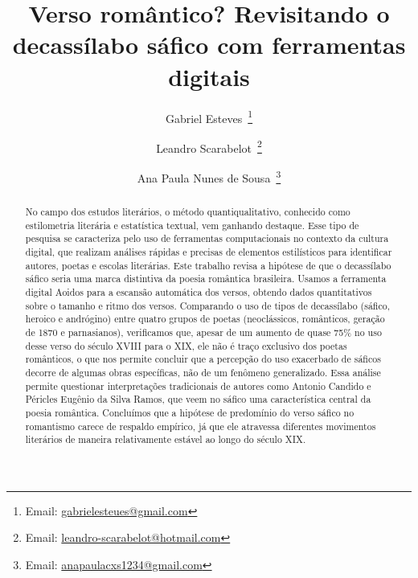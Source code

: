 \documentclass[portuguese]{textolivre}
\title{Verso romântico? Revisitando o decassílabo sáfico com ferramentas digitais}
\author[1]{Gabriel Esteves~\orcid{0000-0003-4719-6672}\thanks{Email: \href{mailto:gabrielesteues@gmail.com}{gabrielesteues@gmail.com}}}
\author[1]{Leandro Scarabelot~\orcid{0000-0003-4151-4924}\thanks{Email: \href{mailto:leandro-scarabelot@hotmail.com}{leandro-scarabelot@hotmail.com}}}
\author[1]{Ana Paula Nunes de Sousa~\orcid{0000-0002-9971-311X}\thanks{Email: \href{mailto:anapaulacxs1234@gmail.com}{anapaulacxs1234@gmail.com}}}
\affil[1]{Universidade Federal de Santa Catarina, Florianópolis, SC, Brasil.}
\begin{document}
\maketitle
\begin{polyabstract}
\begin{abstract}
No campo dos estudos literários, o método quantiqualitativo, conhecido como estilometria literária e estatística textual, vem ganhando destaque. Esse tipo de pesquisa se caracteriza pelo uso de ferramentas computacionais no contexto da cultura digital, que realizam análises rápidas e precisas de elementos estilísticos para identificar autores, poetas e escolas literárias. Este trabalho revisa a hipótese de que o decassílabo sáfico seria uma marca distintiva da poesia romântica brasileira. Usamos a ferramenta digital Aoidos para a escansão automática dos versos, obtendo dados quantitativos sobre o tamanho e ritmo dos versos. Comparando o uso de tipos de decassílabo (sáfico, heroico e andrógino) entre quatro grupos de poetas (neoclássicos, românticos, geração de 1870 e parnasianos), verificamos que, apesar de um aumento de quase 75\% no uso desse verso do século XVIII para o XIX, ele não é traço exclusivo dos poetas românticos, o que nos permite concluir que a percepção do uso exacerbado de sáficos decorre de algumas obras específicas, não de um fenômeno generalizado. Essa análise permite questionar interpretações tradicionais de autores como Antonio Candido e Péricles Eugênio da Silva Ramos, que veem no sáfico uma característica central da poesia romântica. Concluímos que a hipótese de predomínio do verso sáfico no romantismo carece de respaldo empírico, já que ele atravessa diferentes movimentos literários de maneira relativamente estável ao longo do século XIX.

\end{abstract}


\end{polyabstract}
\end{document}
